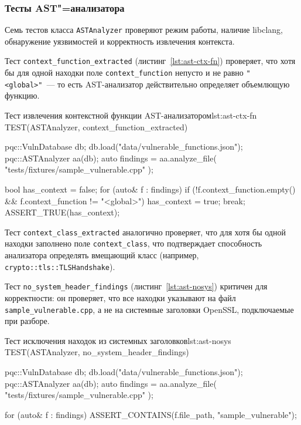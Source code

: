 \subsubsection{Тесты AST"=анализатора}

Семь тестов класса \texttt{ASTAnalyzer} проверяют режим работы, наличие
libclang, обнаружение уязвимостей и корректность извлечения контекста.

Тест \texttt{context\_function\_extracted}
(листинг~\ref{lst:ast-ctx-fn}) проверяет, что хотя бы для одной находки
поле \texttt{context\_function} непусто и не равно \texttt{"<global>"}~---
то есть AST-анализатор действительно определяет объемлющую функцию.

\begin{itmolisting}[C++]{Тест извлечения контекстной функции AST-анализатором}{lst:ast-ctx-fn}
TEST(ASTAnalyzer, context_function_extracted) {
    pqc::VulnDatabase db;
    db.load("data/vulnerable_functions.json");
    pqc::ASTAnalyzer aa(db);
    auto findings = aa.analyze_file(
        "tests/fixtures/sample_vulnerable.cpp"
    );

    bool has_context = false;
    for (auto& f : findings)
        if (!f.context_function.empty() &&
             f.context_function != "<global>")
            { has_context = true; break; }
    ASSERT_TRUE(has_context);
}
\end{itmolisting}

Тест \texttt{context\_class\_extracted} аналогично проверяет, что для
хотя бы одной находки заполнено поле \texttt{context\_class}, что
подтверждает способность анализатора определять вмещающий класс (например,
\texttt{crypto::tls::TLSHandshake}).

Тест \texttt{no\_system\_header\_findings} (листинг~\ref{lst:ast-nosys})
критичен для корректности: он проверяет, что все находки указывают
на файл \texttt{sample\_vulnerable.cpp}, а не на системные заголовки
OpenSSL, подключаемые при разборе.

\begin{itmolisting}[C++]{Тест исключения находок из системных заголовков}{lst:ast-nosys}
TEST(ASTAnalyzer, no_system_header_findings) {
    pqc::VulnDatabase db;
    db.load("data/vulnerable_functions.json");
    pqc::ASTAnalyzer aa(db);
    auto findings = aa.analyze_file(
        "tests/fixtures/sample_vulnerable.cpp"
    );

    for (auto& f : findings)
        ASSERT_CONTAINS(f.file_path, "sample_vulnerable");
}
\end{itmolisting}

